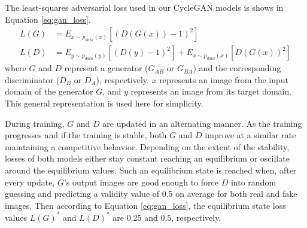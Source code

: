 The least-squares adversarial loss used in our CycleGAN models is shows in Equation \ref{eq:gan_loss}.
\begin{equation}
    \begin{aligned}
    L(G) &= E_{x \sim p_{data}(x)} [(D(G(x)) - 1)^2] \\
    L(D) &= E_{y \sim p_{data}(y)} [(D(y) - 1)^2] + E_{x \sim p_{data}(x)} [D(G(x))^2]
    \end{aligned}
    \label{eq:gan_loss}
\end{equation}
where $G$ and $D$ represent a generator ($G_{AB}$ or $G_{BA}$) and the corresponding discriminator ($D_B$ or $D_A$), respectively. $x$ represents an image from the input domain of the generator $G$, and $y$ represents an image from its target domain. This general representation is used here for simplicity. 

During training, $G$ and $D$ are updated in an alternating manner. As the training progresses and if the training is stable, both $G$ and $D$ improve at a similar rate maintaining a competitive behavior. Depending on the extent of the stability, losses of both models either stay constant reaching an equilibrium or oscillate around the equilibrium values. Such an equilibrium state is reached when, after every update, $G$'s output images are good enough to force $D$ into random guessing and predicting a validity value of 0.5 on average for both real and fake images. Then according to Equation \ref{eq:gan_loss}, the equilibrium state loss values $L(G)^*$ and $L(D)^*$ are 0.25 and 0.5, respectively. 

